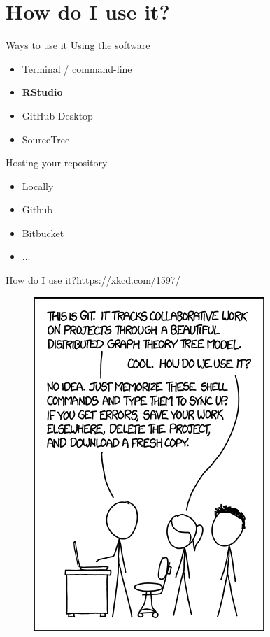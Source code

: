 \documentclass{beamer}
\begin{document}
\section{How do I use it?}

\begin{frame}{Ways to use it}
    Using the software
    \begin{itemize}
        \item Terminal / command-line
        \item \textbf{RStudio}
        \item GitHub Desktop
        \item SourceTree
    \end{itemize}
    Hosting your repository
    \begin{itemize}
        \item Locally
        \item Github
        \item Bitbucket
        \item ...
    \end{itemize}
\end{frame}

\begin{frame}{How do I use it?}{\url{https://xkcd.com/1597/}}

  \begin{figure}
    \centering
    \includegraphics[height=0.8\textheight]{git}
  \end{figure}
  
\end{frame}
\end{document}
